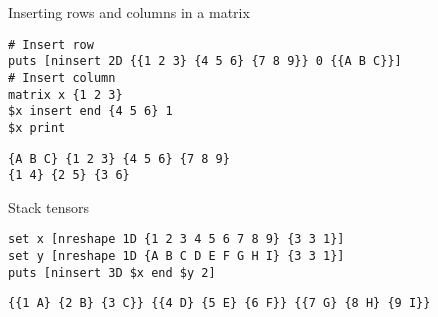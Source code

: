 \documentclass{article}
\begin{document}
\begin{example}{Inserting rows and columns in a matrix}
\begin{lstlisting}
# Insert row
puts [ninsert 2D {{1 2 3} {4 5 6} {7 8 9}} 0 {{A B C}}]
# Insert column
matrix x {1 2 3}
$x insert end {4 5 6} 1
$x print
\end{lstlisting}
\tcblower
\begin{lstlisting}
{A B C} {1 2 3} {4 5 6} {7 8 9}
{1 4} {2 5} {3 6}
\end{lstlisting}
\end{example}

\begin{example}{Stack tensors}
\begin{lstlisting}
set x [nreshape 1D {1 2 3 4 5 6 7 8 9} {3 3 1}]
set y [nreshape 1D {A B C D E F G H I} {3 3 1}]
puts [ninsert 3D $x end $y 2]
\end{lstlisting}
\tcblower
\begin{lstlisting}
{{1 A} {2 B} {3 C}} {{4 D} {5 E} {6 F}} {{7 G} {8 H} {9 I}}
\end{lstlisting}
\end{example}

\clearpage
{\normalsize\printindex}
\end{document}
